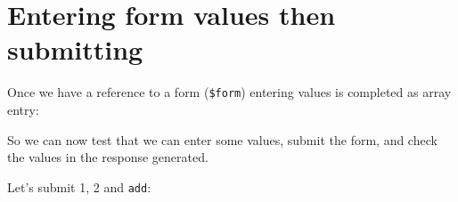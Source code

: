 \documentclass[a4paperpaper,openright]{book}
\newenvironment{Shaded}{}{}
\newcommand{\DecValTok}[1]{\textcolor[rgb]{0.25,0.63,0.44}{#1}}
\newcommand{\KeywordTok}[1]{\textcolor[rgb]{0.00,0.44,0.13}{\textbf{#1}}}
\newcommand{\NormalTok}[1]{#1}
\newcommand{\OtherTok}[1]{\textcolor[rgb]{0.00,0.44,0.13}{#1}}
\newcommand{\StringTok}[1]{\textcolor[rgb]{0.25,0.44,0.63}{#1}}
\begin{document}
\hypertarget{entering-form-values-then-submitting}{%
\section{Entering form values then
submitting}\label{entering-form-values-then-submitting}}

Once we have a reference to a form (\texttt{\$form}) entering values is
completed as array entry:

\begin{Shaded}
\end{Shaded}

So we can now test that we can enter some values, submit the form, and
check the values in the response generated.

Let's submit 1, 2 and \texttt{add}:
\end{document}
